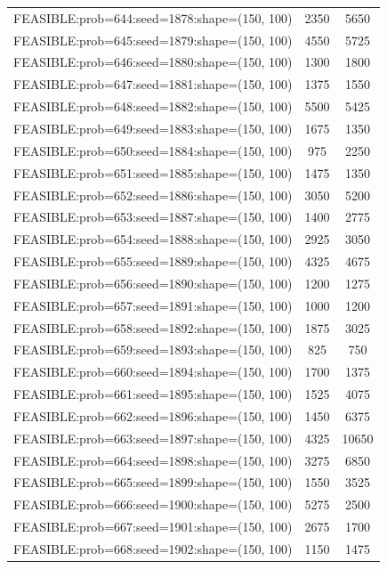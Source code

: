 \begin{longtable}{lcc}
FEASIBLE:prob=644:seed=1878:shape=(150, 100) &     2350 &  5650 \\
FEASIBLE:prob=645:seed=1879:shape=(150, 100) &     4550 &  5725 \\
FEASIBLE:prob=646:seed=1880:shape=(150, 100) &     1300 &  1800 \\
FEASIBLE:prob=647:seed=1881:shape=(150, 100) &     1375 &  1550 \\
FEASIBLE:prob=648:seed=1882:shape=(150, 100) &     5500 &  5425 \\
FEASIBLE:prob=649:seed=1883:shape=(150, 100) &     1675 &  1350 \\
FEASIBLE:prob=650:seed=1884:shape=(150, 100) &      975 &  2250 \\
FEASIBLE:prob=651:seed=1885:shape=(150, 100) &     1475 &  1350 \\
FEASIBLE:prob=652:seed=1886:shape=(150, 100) &     3050 &  5200 \\
FEASIBLE:prob=653:seed=1887:shape=(150, 100) &     1400 &  2775 \\
FEASIBLE:prob=654:seed=1888:shape=(150, 100) &     2925 &  3050 \\
FEASIBLE:prob=655:seed=1889:shape=(150, 100) &     4325 &  4675 \\
FEASIBLE:prob=656:seed=1890:shape=(150, 100) &     1200 &  1275 \\
FEASIBLE:prob=657:seed=1891:shape=(150, 100) &     1000 &  1200 \\
FEASIBLE:prob=658:seed=1892:shape=(150, 100) &     1875 &  3025 \\
FEASIBLE:prob=659:seed=1893:shape=(150, 100) &      825 &   750 \\
FEASIBLE:prob=660:seed=1894:shape=(150, 100) &     1700 &  1375 \\
FEASIBLE:prob=661:seed=1895:shape=(150, 100) &     1525 &  4075 \\
FEASIBLE:prob=662:seed=1896:shape=(150, 100) &     1450 &  6375 \\
FEASIBLE:prob=663:seed=1897:shape=(150, 100) &     4325 & 10650 \\
FEASIBLE:prob=664:seed=1898:shape=(150, 100) &     3275 &  6850 \\
FEASIBLE:prob=665:seed=1899:shape=(150, 100) &     1550 &  3525 \\
FEASIBLE:prob=666:seed=1900:shape=(150, 100) &     5275 &  2500 \\
FEASIBLE:prob=667:seed=1901:shape=(150, 100) &     2675 &  1700 \\
FEASIBLE:prob=668:seed=1902:shape=(150, 100) &     1150 &  1475 \\

\end{longtable}
